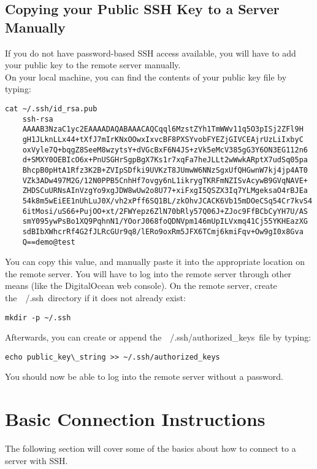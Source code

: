 \documentclass[12pt]{report}
\begin{document}
\subsection{Copying your Public SSH Key to a Server Manually}
If you do not have password-based SSH access available, you will have to add your public key to the remote server manually.\\
On your local machine, you can find the contents of your public key file by typing:
\begin{lstlisting} 
cat ~/.ssh/id_rsa.pub
    ssh-rsa
    AAAAB3NzaC1yc2EAAAADAQABAAACAQCqql6MzstZYh1TmWWv11q5O3pISj2ZFl9H
    gH1JLknLLx44+tXfJ7mIrKNxOOwxIxvcBF8PXSYvobFYEZjGIVCEAjrUzLiIxbyC
    oxVyle7Q+bqgZ8SeeM8wzytsY+dVGcBxF6N4JS+zVk5eMcV385gG3Y6ON3EG112n6
    d+SMXY0OEBIcO6x+PnUSGHrSgpBgX7Ks1r7xqFa7heJLLt2wWwkARptX7udSq05pa
    BhcpB0pHtA1Rfz3K2B+ZVIpSDfki9UVKzT8JUmwW6NNzSgxUfQHGwnW7kj4jp4AT0
    VZk3ADw497M2G/12N0PPB5CnhHf7ovgy6nL1ikrygTKRFmNZISvAcywB9GVqNAVE+
    ZHDSCuURNsAInVzgYo9xgJDW8wUw2o8U77+xiFxgI5QSZX3Iq7YLMgeksaO4rBJEa
    54k8m5wEiEE1nUhLuJ0X/vh2xPff6SQ1BL/zkOhvJCACK6Vb15mDOeCSq54Cr7kvS4
    6itMosi/uS66+PujOO+xt/2FWYepz6ZlN70bRly57Q06J+ZJoc9FfBCbCyYH7U/AS
    smY095ywPsBo1XQ9PqhnN1/YOorJ068foQDNVpm146mUpILVxmq41Cj55YKHEazXG
    sdBIbXWhcrRf4G2fJLRcGUr9q8/lERo9oxRm5JFX6TCmj6kmiFqv+Ow9gI0x8Gva
    Q==demo@test
\end{lstlisting} 
You can copy this value, and manually paste it into the appropriate location on the remote server. You will have to log into the remote server through other means (like the DigitalOcean web console).
On the remote server, create the ~/.ssh directory if it does not already exist:
\begin{lstlisting} 
mkdir -p ~/.ssh
\end{lstlisting} 
Afterwards, you can create or append the ~/.ssh/authorized\_keys file by typing:
\begin{lstlisting} 
echo public_key\_string >> ~/.ssh/authorized_keys
\end{lstlisting} 
You should now be able to log into the remote server without a password.

\section{Basic Connection Instructions}
The following section will cover some of the basics about how to connect to a server with SSH.
\end{document}
